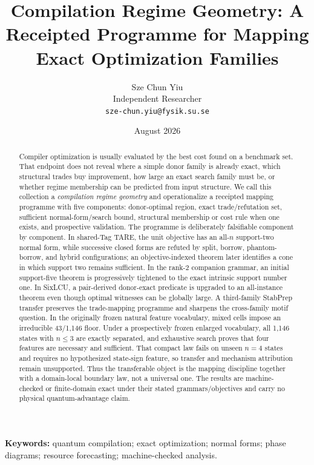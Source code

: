 \documentclass[11pt]{article}
\title{Compilation Regime Geometry: A Receipted Programme for Mapping Exact Optimization Families}
\author{Sze Chun Yiu\\Independent Researcher\\\texttt{sze-chun.yiu@fysik.su.se}}
\date{August 2026}
\begin{document}
\maketitle
\begin{abstract}
Compiler optimization is usually evaluated by the best cost found on a benchmark set. That endpoint does not reveal where a simple donor family is already exact, which structural trades buy improvement, how large an exact search family must be, or whether regime membership can be predicted from input structure. We call this collection a \emph{compilation regime geometry} and operationalize a receipted mapping programme with five components: donor-optimal region, exact trade/refutation set, sufficient normal-form/search bound, structural membership or cost rule when one exists, and prospective validation. The programme is deliberately falsifiable component by component. In shared-Tag TARE, the unit objective has an all-$n$ support-two normal form, while successive closed forms are refuted by split, borrow, phantom-borrow, and hybrid configurations; an objective-indexed theorem later identifies a cone in which support two remains sufficient. In the rank-2 companion grammar, an initial support-five theorem is progressively tightened to the exact intrinsic support number one. In SixLCU, a pair-derived donor-exact predicate is upgraded to an all-instance theorem even though optimal witnesses can be globally large. A third-family StabPrep transfer preserves the trade-mapping programme and sharpens the cross-family motif question. In the originally frozen natural feature vocabulary, mixed cells impose an irreducible 43/1,146 floor. Under a prospectively frozen enlarged vocabulary, all 1,146 states with $n\leq 3$ are exactly separated, and exhaustive search proves that four features are necessary and sufficient. That compact law fails on unseen $n=4$ states and requires no hypothesized state-sign feature, so transfer and mechanism attribution remain unsupported. Thus the transferable object is the mapping discipline together with a domain-local boundary law, not a universal one. The results are machine-checked or finite-domain exact under their stated grammars/objectives and carry no physical quantum-advantage claim.
\end{abstract}

\noindent\textbf{Keywords:} quantum compilation; exact optimization; normal forms; phase diagrams; resource forecasting; machine-checked analysis.













\end{document}
